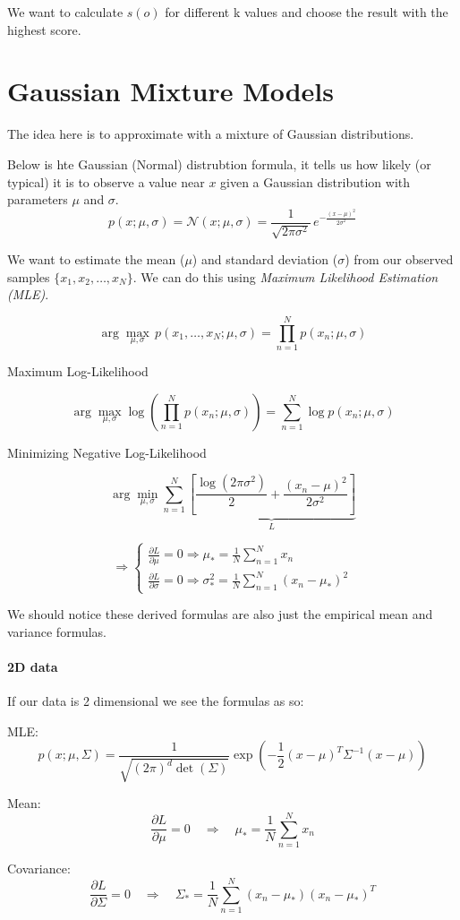 \documentclass[11pt]{article}
\begin{document}
We want to calculate $s(o)$ for different k values and choose the result with the highest score.

\pagebreak

\section*{Gaussian Mixture Models}
The idea here is to approximate with a mixture of Gaussian distributions.

Below is hte Gaussian (Normal) distrubtion formula, it tells us how likely (or typical) it is to observe a value near 
$x$ given a Gaussian distribution with parameters $\mu$ and $\sigma$.
\[
p(x; \mu, \sigma) = \mathcal{N}(x; \mu, \sigma) = \frac{1}{\sqrt{2\pi\sigma^2}} \, e^{ -\frac{(x - \mu)^2}{2\sigma^2} }
\]

We want to estimate the mean ($\mu$) and standard deviation ($\sigma$) from our observed samples $\{x_1, x_2, \dots, x_N\}$. We can do this using \textit{Maximum Likelihood Estimation (MLE)}.


\[
\arg\max_{\mu, \sigma} \, p(x_1, \dots, x_N; \mu, \sigma) = \prod_{n=1}^{N} p(x_n; \mu, \sigma)
\]

Maximum Log-Likelihood

\[
\arg\max_{\mu, \sigma} \log \left( \prod_{n=1}^{N} p(x_n; \mu, \sigma) \right) = \sum_{n=1}^{N} \log p(x_n; \mu, \sigma)
\]

Minimizing Negative Log-Likelihood

\[
\arg\min_{\mu, \sigma} \sum_{n=1}^{N} 
\underbrace{
\left[
\frac{ \log(2\pi\sigma^2) }{2} + \frac{(x_n - \mu)^2}{2\sigma^2}
\right]
}_{L}
\]

\[
\Rightarrow
\begin{cases}
\frac{\partial L}{\partial \mu} = 0 \Rightarrow \mu_* = \frac{1}{N} \sum_{n=1}^{N} x_n \\[1em]
\frac{\partial L}{\partial \sigma} = 0 \Rightarrow \sigma^2_* = \frac{1}{N} \sum_{n=1}^{N} (x_n - \mu_*)^2
\end{cases}
\]

We should notice these derived formulas are also just the empirical mean and variance formulas.

\paragraph*{2D data}
If our data is 2 dimensional we see the formulas as so:

\medskip

MLE:
\[
p(x; \mu, \Sigma) = \frac{1}{\sqrt{(2\pi)^d \det(\Sigma)}} 
\exp\left( -\frac{1}{2} (x - \mu)^T \Sigma^{-1} (x - \mu) \right)
\]

Mean:
\[
\frac{\partial L}{\partial \mu} = 0 \quad \Rightarrow \quad 
\mu_* = \frac{1}{N} \sum_{n=1}^{N} x_n
\]

Covariance:
\[
\frac{\partial L}{\partial \Sigma} = 0 \quad \Rightarrow \quad 
\Sigma_* = \frac{1}{N} \sum_{n=1}^{N} (x_n - \mu_*)(x_n - \mu_*)^T
\]
\end{document}
